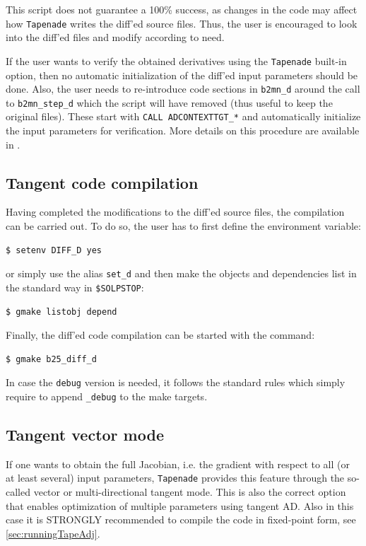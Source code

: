 This script does not guarantee a 100\% success, as changes in the code may affect how {\tt Tapenade} writes the diff'ed source files. Thus, the user is encouraged to look into the diff'ed files and modify according to need.

If the user wants to verify the obtained derivatives using the {\tt Tapenade} built-in option, then no automatic initialization of the diff'ed input parameters should be done. Also, the user needs to re-introduce code sections in {\tt b2mn\_d} around the call to {\tt b2mn\_step\_d} which the script will have removed (thus useful to keep the original files). These start with {\tt CALL ADCONTEXTTGT\_*} and automatically initialize the input parameters for verification. More details on this procedure are available in \cite{tapesite}.

\subsection{Tangent code compilation}

Having completed the modifications to the diff'ed source files, the compilation can be carried out. To do so, the user has to first define the environment variable:
\begin{verbatim}
$ setenv DIFF_D yes
\end{verbatim}
or simply use the alias {\tt set\_d} and then make the objects and dependencies list in the standard way in {\tt \$SOLPSTOP}:
\begin{verbatim}
$ gmake listobj depend
\end{verbatim}
Finally, the diff'ed code compilation can be started with the command:
\begin{verbatim}
$ gmake b25_diff_d
\end{verbatim}

In case the {\tt debug} version is needed, it follows the standard \SOLPSITER rules which simply require to append {\tt \_debug} to the make targets.

\subsection{Tangent vector mode}\label{sec:tgtvec}

If one wants to obtain the full Jacobian, i.e. the gradient with respect to all (or at least several) input parameters, {\tt Tapenade} provides this feature through the so-called vector or multi-directional tangent mode. This is also the correct option that enables optimization of multiple parameters using tangent AD. Also in this case it is STRONGLY recommended to compile the code in fixed-point form, see \ref{sec:runningTapeAdj}.

